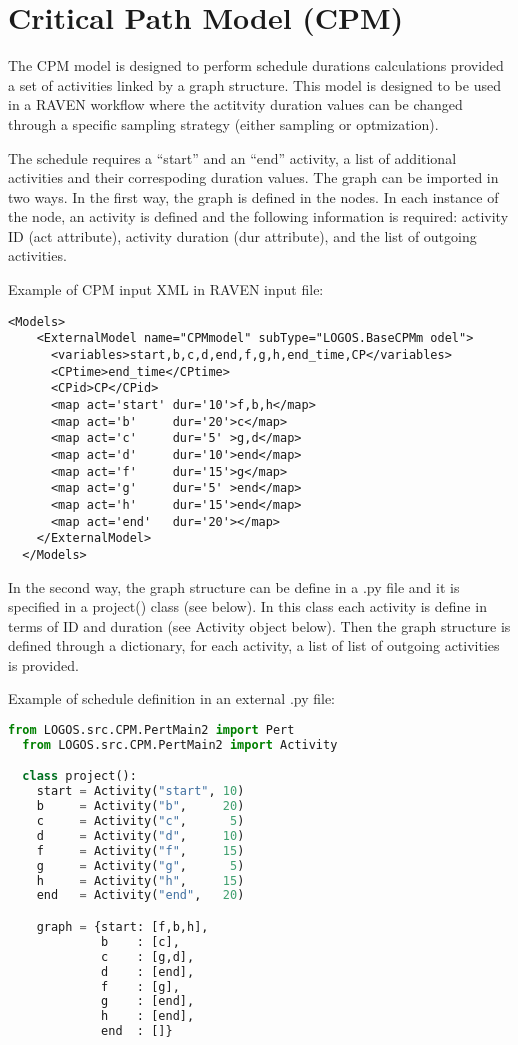 \section{Critical Path Model (CPM)}
\label{sec:CPM}

The CPM model is designed to perform schedule durations calculations provided a set of activities
linked by a graph structure.
This model is designed to be used in a RAVEN workflow where the actitvity duration values can be
changed through a specific sampling strategy (either sampling or optmization).

The schedule requires a ``start'' and an ``end'' activity, a list of additional activities and
their correspoding duration values.
The graph can be imported in two ways. In the first way, the graph is defined in the
 nodes. In each instance of the  node, an activity is defined and the
following information is required: activity ID (act attribute), activity duration (dur attribute),
and the list of outgoing activities.

Example of CPM input XML in RAVEN input file:
\begin{lstlisting}[style=XML]
  <Models>
    <ExternalModel name="CPMmodel" subType="LOGOS.BaseCPMm odel">
      <variables>start,b,c,d,end,f,g,h,end_time,CP</variables>
      <CPtime>end_time</CPtime>
      <CPid>CP</CPid>
      <map act='start' dur='10'>f,b,h</map>
      <map act='b'     dur='20'>c</map>
      <map act='c'     dur='5' >g,d</map>
      <map act='d'     dur='10'>end</map>
      <map act='f'     dur='15'>g</map>
      <map act='g'     dur='5' >end</map>
      <map act='h'     dur='15'>end</map>
      <map act='end'   dur='20'></map>
    </ExternalModel>
  </Models>
\end{lstlisting}

In the second way, the graph structure can be define in a .py file and it is specified in a
project() class (see below). In this class each activity is define in terms of ID and duration
(see Activity object below).
Then the graph structure is defined through a dictionary, for each activity, a list of list of
outgoing activities is provided.

Example of schedule definition in an external .py file:
\begin{lstlisting}[language=Python]
  from LOGOS.src.CPM.PertMain2 import Pert
  from LOGOS.src.CPM.PertMain2 import Activity

  class project():
    start = Activity("start", 10)
    b     = Activity("b",     20)
    c     = Activity("c",      5)
    d     = Activity("d",     10)
    f     = Activity("f",     15)
    g     = Activity("g",      5)
    h     = Activity("h",     15)
    end   = Activity("end",   20)

    graph = {start: [f,b,h],
             b    : [c],
             c    : [g,d],
             d    : [end],
             f    : [g],
             g    : [end],
             h    : [end],
             end  : []}
  \end{lstlisting}


